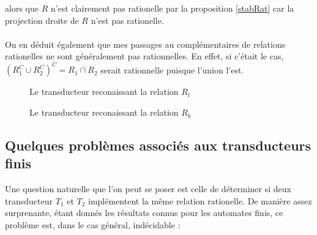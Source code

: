 \documentclass{scrartcl}
\begin{document}
\begin{flushleft}
alors que $R$ n'est clairement pas rationelle par la proposition \ref{stabRat} car la projection droite de $R$ n'est pas rationelle.
\\~\\
On en déduit également que mes passages au complémentaires de relations rationelles ne sont généralement pas rationnelles. En effet, si
c'était le cas,
$(R_1^C \cup R_2^C)^C  = R_1 \cap R_2$ serait rationnelle puisque l'union l'est.
\begin{figure}[h] 
    \caption{Le transducteur reconaissant la relation $R_l$}\label{autoRl}
    \begin{center}
    \end{center}
\end{figure}

\begin{figure}[h] 
    \caption{Le transducteur reconaissant la relation $R_b$}\label{autoRb}
    \begin{center}
    \end{center}
\end{figure}

\subsection{Quelques problèmes associés aux transducteurs finis}

Une question naturelle que l'on peut se poser est celle de déterminer si deux transducteur $T_1$ et $T_2$ implémentent la même relation rationelle.
De manière assez surprenante, étant donnés les résultats connus pour les automates finis, ce problème est, dans le cas général, indécidable \cite{indecEqu} :


\end{flushleft}
\end{document}
